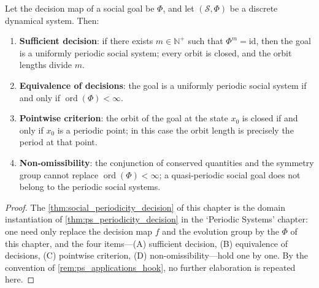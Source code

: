 \begin{theorem}\label{thm:social_periodicity_decision}
Let the decision map of a social goal be $\Phi$, and let $(\mathcal S,\Phi)$ be a discrete dynamical system. Then:
\begin{enumerate}[label=(\Alph*)]
    \item \textbf{Sufficient decision}: if there exists $m\in\mathbb N^+$ such that $\Phi^m=\mathrm{id}$, then the goal is a uniformly periodic social system; every orbit is closed, and the orbit lengths divide $m$.
    \item \textbf{Equivalence of decisions}: the goal is a uniformly periodic social system if and only if $\operatorname{ord}(\Phi)<\infty$.
    \item \textbf{Pointwise criterion}: the orbit of the goal at the state $x_0$ is closed if and only if $x_0$ is a periodic point; in this case the orbit length is precisely the period at that point.
    \item \textbf{Non-omissibility}: the conjunction of conserved quantities and the symmetry group cannot replace $\operatorname{ord}(\Phi)<\infty$; a quasi-periodic social goal does not belong to the periodic social systems.
\end{enumerate}
\end{theorem}

\begin{proof}
The \cref{thm:social_periodicity_decision} of this chapter is the domain instantiation of \cref{thm:ps_periodicity_decision} in the `Periodic Systems' chapter:
one need only replace the decision map $f$ and the evolution group by the $\Phi$ of this chapter, and the four items---(A) sufficient decision, (B) equivalence of decisions, (C) pointwise criterion,
(D) non-omissibility---hold one by one. By the convention of \cref{rem:ps_applications_hook}, no further elaboration is repeated here.
\end{proof}

